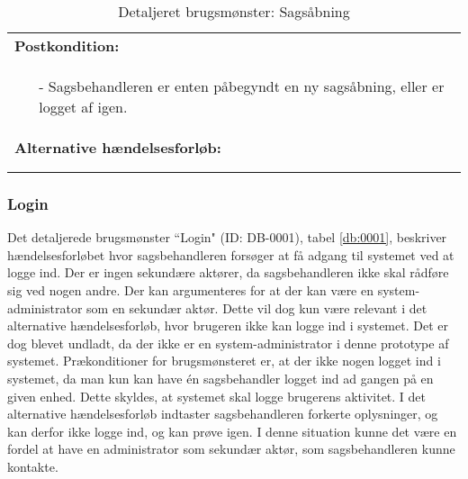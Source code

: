 \documentclass[../../main.tex]{subfiles}
\begin{document}
\begin{center}
\begin{longtable}{| p{}|}
\textbf{Postkondition:} \\
  \begin{minipage}[t]{\textwidth}
    \begin{itemize}
    \item[-] Sagsbehandleren er enten påbegyndt en ny sagsåbning, eller er logget af igen.
    \end{itemize}
  \end{minipage} \\ \hline

\textbf{Alternative hændelsesforløb:} \\
  \begin{minipage}[t]{\textwidth}
    
  \end{minipage} \\ \hline
 \caption{Detaljeret brugsmønster: Sagsåbning}
 \label{db:0000}
\end{longtable}
\end{center}

\subsubsection{Login}
Det detaljerede brugsmønster “Login" (ID: DB-0001), tabel \ref{db:0001}, beskriver hændelsesforløbet hvor sagsbehandleren forsøger at få adgang til systemet ved at logge ind. Der er ingen sekundære aktører, da sagsbehandleren ikke skal rådføre sig ved nogen andre. Der kan argumenteres for at der kan være en system-administrator som en sekundær aktør. Dette vil dog kun være relevant i det alternative hændelsesforløb, hvor brugeren ikke kan logge ind i systemet. Det er dog blevet undladt, da der ikke er en system-administrator i denne prototype af systemet. Prækonditioner for brugsmønsteret er, at der ikke nogen logget ind i systemet, da man kun kan have én sagsbehandler logget ind ad gangen på en given enhed. Dette skyldes, at systemet skal logge brugerens aktivitet. I det alternative hændelsesforløb indtaster sagsbehandleren forkerte oplysninger, og kan derfor ikke logge ind, og kan prøve igen. I denne situation kunne det være en fordel at have en administrator som sekundær aktør, som sagsbehandleren kunne kontakte.  
\end{document}
